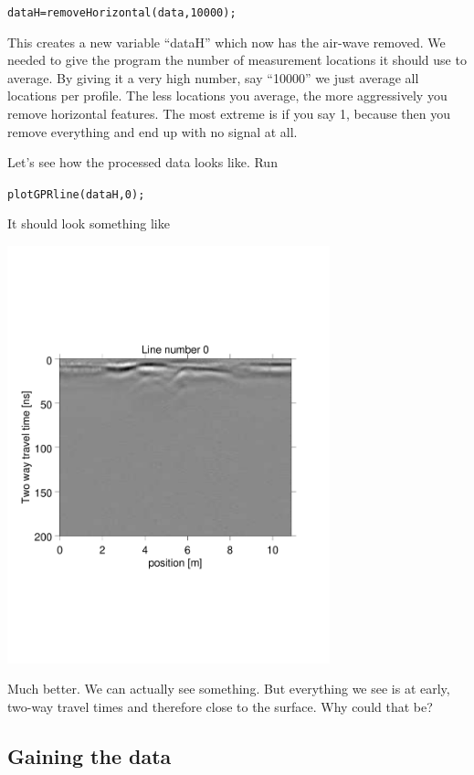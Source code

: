 \documentclass[11pt]{article}
\begin{document}
\qquad\verb#dataH=removeHorizontal(data,10000);#

This creates a new variable ``dataH'' which now has the air-wave
removed. We needed to give the program the number of measurement
locations it should use to average. By giving it a very high number,
say ``10000'' we just average all locations per profile. The less
locations you average, the more aggressively you remove horizontal
features. The most extreme is if you say 1, because then you remove
everything and end up with no signal at all.

Let's see how the processed data looks like. Run

\qquad \verb#plotGPRline(dataH,0);#

\clearpage
It should look something like

\begin{center}
\includegraphics[width=0.7\textwidth, trim = 0.9cm 6cm 2cm
  6.5cm,clip]{figures/GPRlineH0}
\end{center}
 
Much better. We can actually see something. But everything we see is
at early, two-way travel times and therefore close to the surface. Why
could that be?

\subsection{Gaining the data}
\end{document}
